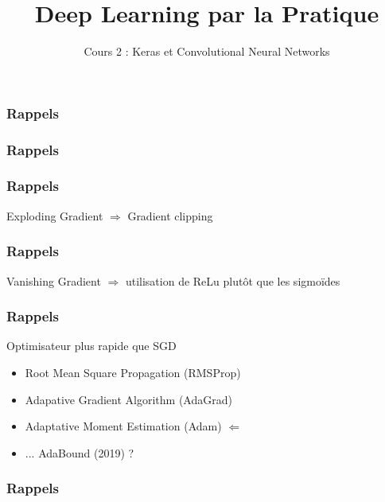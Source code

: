 \documentclass{formation}
\title{Deep Learning par la Pratique}
\subtitle{Cours 2 : Keras et Convolutional Neural Networks}
\begin{document}
\maketitle

\begin{frame}
  \frametitle{Rappels}
\end{frame}

\begin{frame}
  \frametitle{Rappels}
\end{frame}

\begin{frame}
  \frametitle{Rappels}
  Exploding Gradient $\Rightarrow$ Gradient clipping
\end{frame}

\begin{frame}
  \frametitle{Rappels}
  Vanishing Gradient $\Rightarrow$ utilisation de ReLu plutôt que les sigmoïdes
\end{frame}

\begin{frame}
  \frametitle{Rappels}
  Optimisateur plus rapide que SGD
  \begin{itemize}
  \item Root Mean Square Propagation (RMSProp)
  \item Adapative Gradient Algorithm (AdaGrad)
  \item Adaptative Moment Estimation (Adam)    $\Leftarrow$
  \item ... AdaBound (2019) ?
 \end{itemize}
\end{frame}

\begin{frame}
  \frametitle{Rappels}
\end{frame}
\end{document}
